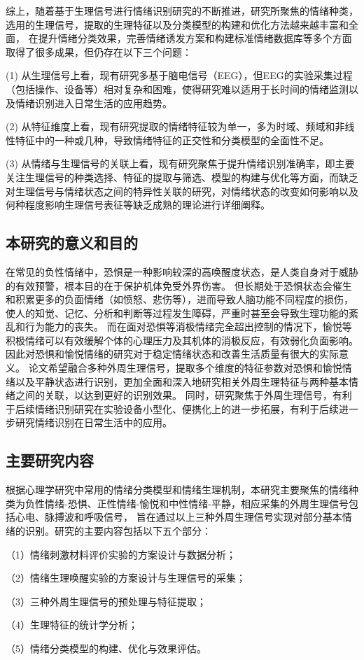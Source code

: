 综上，随着基于生理信号进行情绪识别研究的不断推进，研究所聚焦的情绪种类，选用的生理信号，提取的生理特征以及分类模型的构建和优化方法越来越丰富和全面，
在提升情绪分类效果，完善情绪诱发方案和构建标准情绪数据库等多个方面取得了很多成果，但仍存在以下三个问题：

(1) 从生理信号上看，现有研究多基于脑电信号（EEG），但EEG的实验采集过程（包括操作、设备等）相对复杂和困难，使得研究难以适用于长时间的情绪监测以及情绪识别进入日常生活的应用趋势。

(2) 从特征维度上看，现有研究提取的情绪特征较为单一，多为时域、频域和非线性特征中的一种或几种，导致情绪特征的正交性和分类模型的全面性不足。

(3) 从情绪与生理信号的关联上看，现有研究聚焦于提升情绪识别准确率，即主要关注生理信号的种类选择、特征的提取与筛选、模型的构建与优化等方面，而缺乏对生理信号与情绪状态之间的特异性关联的研究，对情绪状态的改变如何影响以及何种程度影响生理信号表征等缺乏成熟的理论进行详细阐释。

\subsection{本研究的意义和目的}
在常见的负性情绪中，恐惧是一种影响较深的高唤醒度状态\cite{James1884}，是人类自身对于威胁的有效预警，根本目的在于保护机体免受外界伤害。
但长期处于恐惧状态会催生和积累更多的负面情绪（如愤怒、悲伤等），进而导致人脑功能不同程度的损伤，使人的知觉、记忆、分析和判断等过程发生障碍，严重时甚至会导致生理功能的紊乱和行为能力的丧失。
而在面对恐惧等消极情绪完全超出控制的情况下，愉悦等积极情绪可以有效缓解个体的心理压力及其机体的消极反应，有效弱化负面影响。因此对恐惧和愉悦情绪的研究对于稳定情绪状态和改善生活质量有很大的实际意义。
论文希望融合多种外周生理信号，提取多个维度的特征参数对恐惧和愉悦情绪以及平静状态进行识别，更加全面和深入地研究相关外周生理特征与两种基本情绪之间的关联，以达到更好的识别效果。
同时，研究聚焦于外周生理信号，有利于后续情绪识别研究在实验设备小型化、便携化上的进一步拓展，有利于后续进一步研究情绪识别在日常生活中的应用。

\subsection{主要研究内容}
根据心理学研究中常用的情绪分类模型和情绪生理机制，本研究主要聚焦的情绪种类为负性情绪-恐惧、正性情绪-愉悦和中性情绪-平静，相应采集的外周生理信号包括心电、脉搏波和呼吸信号，
旨在通过以上三种外周生理信号实现对部分基本情绪的识别。研究的主要内容包括以下五个部分：

（1）情绪刺激材料评价实验的方案设计与数据分析；

（2）情绪生理唤醒实验的方案设计与生理信号的采集；

（3）三种外周生理信号的预处理与特征提取；

（4）生理特征的统计学分析；

（5）情绪分类模型的构建、优化与效果评估。